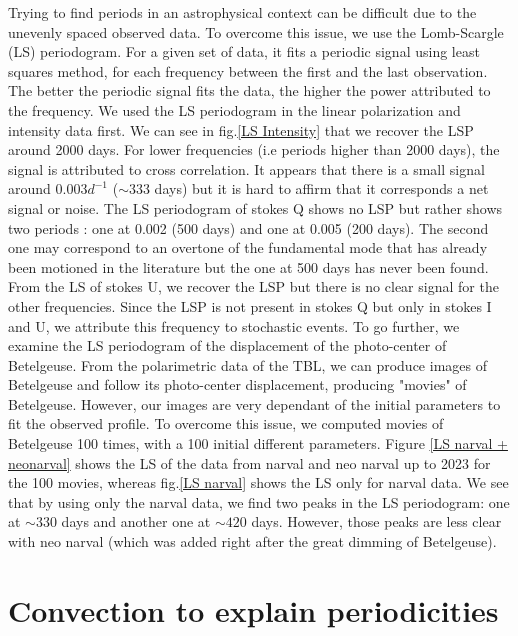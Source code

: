 \documentclass{aa}
\begin{document}
Trying to find periods in an astrophysical context can be difficult due to the unevenly spaced observed data. To overcome this issue, we use the Lomb-Scargle (LS) periodogram. For a given set of data, it fits a periodic signal using least squares method, for each frequency between the first and the last observation. The better the periodic signal fits the data, the higher the power attributed to the frequency. We used the LS periodogram in the linear polarization and intensity data first. We can see in fig.\ref{LS Intensity} that we recover the LSP around 2000 days. For lower frequencies (i.e periods higher than 2000 days), the signal is attributed to cross correlation. It appears that there is a small signal around $0.003 d^{-1}$ ($\sim 333$ days) but it is hard to affirm that it corresponds a net signal or noise. The LS periodogram of stokes Q shows no LSP but rather shows two periods : one at 0.002 (500 days) and one at 0.005 (200 days). The second one may correspond to an overtone of the fundamental mode that has already been motioned in the literature but the one at 500 days has never been found. From the LS of stokes U, we recover the LSP but there is no clear signal for the other frequencies. Since the LSP is not present in stokes Q but only in stokes I and U, we attribute this frequency to stochastic events. To go further, we examine the LS periodogram of the displacement of the photo-center of Betelgeuse. From the polarimetric data of the TBL, we can produce images of Betelgeuse and follow its photo-center displacement, producing "movies" of Betelgeuse. However, our images are very dependant of the initial parameters to fit the observed profile. To overcome this issue, we computed movies of Betelgeuse 100 times, with a 100 initial different parameters.  Figure \ref{LS narval + neonarval} shows the LS of the data from narval and neo narval up to 2023 for the 100 movies, whereas fig.\ref{LS narval} shows the LS only for narval data. We see that by using only the narval data, we find two peaks in the LS periodogram: one at $\sim 330$ days and another one at $\sim 420$ days. However, those peaks are less clear with neo narval (which was added right after the great dimming of Betelgeuse). 

\section{Convection to explain periodicities}
\end{document}
